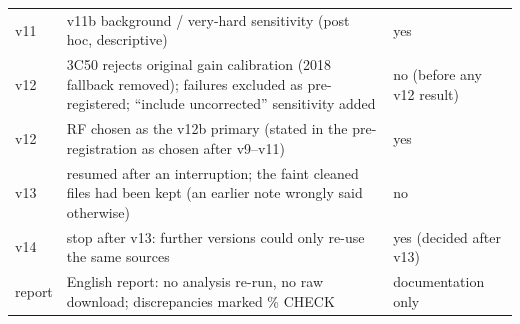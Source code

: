 {\begin{longtable}{@{}p{1.0cm}>{\raggedright\arraybackslash}p{9.4cm}>{\raggedright\arraybackslash}p{3.4cm}@{}}
v11 & v11b background / very-hard sensitivity (post hoc, descriptive) & yes \\
v12 & 3C50 rejects original gain calibration (2018 fallback removed); failures excluded as pre-registered; ``include uncorrected'' sensitivity added & no (before any v12 result) \\
v12 & RF chosen as the v12b primary (stated in the pre-registration as chosen after v9--v11) & yes \\
v13 & resumed after an interruption; the faint cleaned files had been kept (an earlier note wrongly said otherwise) & no \\
v14 & stop after v13: further versions could only re-use the same sources & yes (decided after v13) \\
report & English report: no analysis re-run, no raw download; discrepancies marked \% CHECK & documentation only \\
\end{longtable}}
